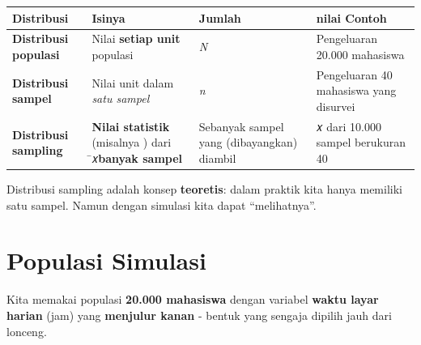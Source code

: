 \documentclass[
  indonesian,
  letterpaper,
]{book}
\newcounter{none} %
\begin{document}
{\def\LTcaptype{none} %
\begin{longtable}[]{@{}
  >{\raggedright\arraybackslash}p{}
  >{\raggedright\arraybackslash}p{}
  >{\raggedright\arraybackslash}p{}
  >{\raggedright\arraybackslash}p{}@{}}
\toprule\noalign{}
\begin{minipage}[b]{\linewidth}\raggedright
Distribusi
\end{minipage} & \begin{minipage}[b]{\linewidth}\raggedright
Isinya
\end{minipage} & \begin{minipage}[b]{\linewidth}\raggedright
Jumlah
\end{minipage} & \begin{minipage}[b]{\linewidth}\raggedright
nilai Contoh
\end{minipage} \\
\midrule\noalign{}
\endhead
\bottomrule\noalign{}
\endlastfoot
\textbf{Distribusi populasi} & Nilai \textbf{setiap unit} populasi &
\emph{N} & Pengeluaran 20.000 mahasiswa \\
\textbf{Distribusi sampel} & Nilai unit dalam \emph{satu sampel} &
\emph{n} & Pengeluaran 40 mahasiswa yang disurvei \\
\textbf{Distribusi sampling} & \textbf{Nilai statistik} (misalnya ) dari
̄𝑥\textbf{banyak sampel} & Sebanyak sampel yang (dibayangkan) diambil &
𝑥 dari 10.000 sampel berukuran 40 \\
\end{longtable}
}

Distribusi sampling adalah konsep \textbf{teoretis}: dalam praktik kita
hanya memiliki satu sampel. Namun dengan simulasi kita dapat
``melihatnya''.

\section{Populasi Simulasi}\label{populasi-simulasi}

Kita memakai populasi \textbf{20.000 mahasiswa} dengan variabel
\textbf{waktu layar harian} (jam) yang \textbf{menjulur kanan} - bentuk
yang sengaja dipilih jauh dari lonceng.
\end{document}
